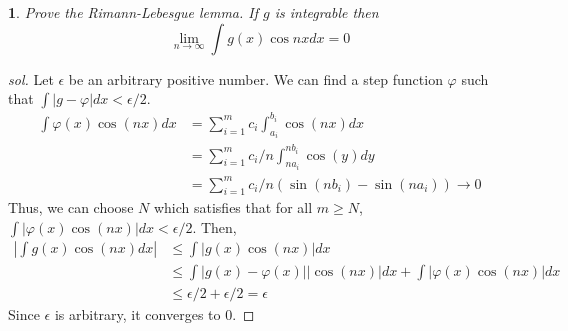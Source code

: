 \documentclass{report}
\newtheorem{ex}{}[section]
\begin{document}
\begin{ex}
Prove the Rimann-Lebesgue lemma. If $g$ is integrable then
\[\lim_{n\to\infty} \int g(x) \cos nx dx  = 0\]
\end{ex}
\begin{proof}[sol]
Let $\epsilon$ be an arbitrary positive number. We can find a step function $\varphi$ such that $\int |g - \varphi|dx < \epsilon / 2$.
\begin{align*}
    \int \varphi(x)\cos(nx)dx &= \sum_{i=1}^m c_i\int_{a_i}^{b_i}\cos(nx)dx\\
    &= \sum_{i=1}^m c_i/n\int_{na_i}^{nb_i}\cos(y)dy\\
    &= \sum_{i=1}^m c_i/n(\sin(nb_i) -\sin(na_i)) \to 0
\end{align*}
Thus, we can choose $N$ which satisfies that for all $m \ge N$, $\int|\varphi(x)\cos(nx)|dx < \epsilon/2$. Then,
\begin{align*}
    |\int g(x)\cos(nx)dx| &\le \int|g(x)\cos(nx)|dx\\
    &\le \int|g(x)-\varphi(x)||\cos(nx)|dx + \int|\varphi(x)\cos(nx)|dx\\
    &\le \epsilon/2 + \epsilon/2 = \epsilon
\end{align*}
Since $\epsilon$ is arbitrary, it converges to 0.
\end{proof}
\end{document}
